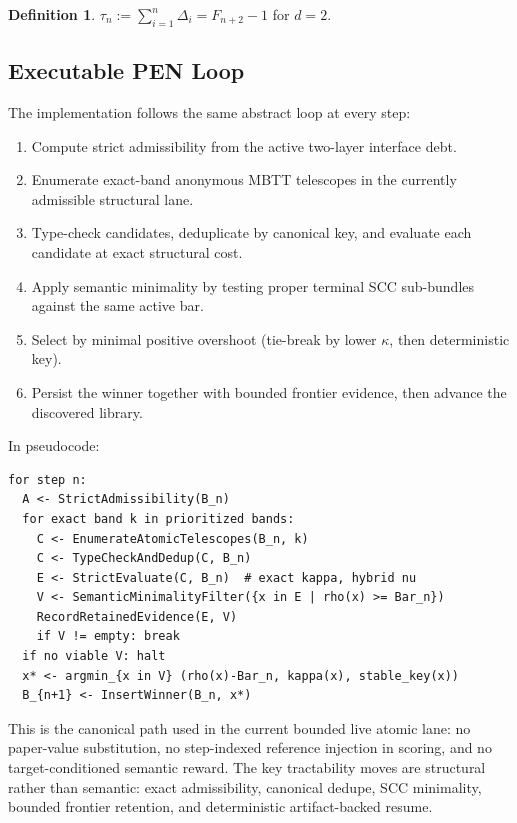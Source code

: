 \documentclass[11pt,a4paper]{article}
\theoremstyle{plain}
\theoremstyle{definition}
\newtheorem{definition}[theorem]{Definition}
\theoremstyle{remark}
\begin{document}
\begin{definition}
\label{def:tau}
$\tau_n := \sum_{i=1}^{n} \Delta_i = F_{n+2} - 1$ for $d = 2$.
\end{definition}

\subsection{Executable PEN Loop}
\label{sec:pen-loop}

The implementation follows the same abstract loop at every step:
\begin{enumerate}[nosep]
    \item Compute strict admissibility from the active two-layer interface debt.
    \item Enumerate exact-band anonymous MBTT telescopes in the currently admissible structural lane.
    \item Type-check candidates, deduplicate by canonical key, and evaluate each candidate at exact structural cost.
    \item Apply semantic minimality by testing proper terminal SCC sub-bundles against the same active bar.
    \item Select by minimal positive overshoot (tie-break by lower $\kappa$, then deterministic key).
    \item Persist the winner together with bounded frontier evidence, then advance the discovered library.
\end{enumerate}

In pseudocode:
\begin{verbatim}
for step n:
  A <- StrictAdmissibility(B_n)
  for exact band k in prioritized bands:
    C <- EnumerateAtomicTelescopes(B_n, k)
    C <- TypeCheckAndDedup(C, B_n)
    E <- StrictEvaluate(C, B_n)  # exact kappa, hybrid nu
    V <- SemanticMinimalityFilter({x in E | rho(x) >= Bar_n})
    RecordRetainedEvidence(E, V)
    if V != empty: break
  if no viable V: halt
  x* <- argmin_{x in V} (rho(x)-Bar_n, kappa(x), stable_key(x))
  B_{n+1} <- InsertWinner(B_n, x*)
\end{verbatim}

This is the canonical path used in the current bounded live atomic lane: no paper-value substitution, no step-indexed reference injection in scoring, and no target-conditioned semantic reward.
The key tractability moves are structural rather than semantic: exact admissibility, canonical dedupe, SCC minimality, bounded frontier retention, and deterministic artifact-backed resume.
\end{document}

